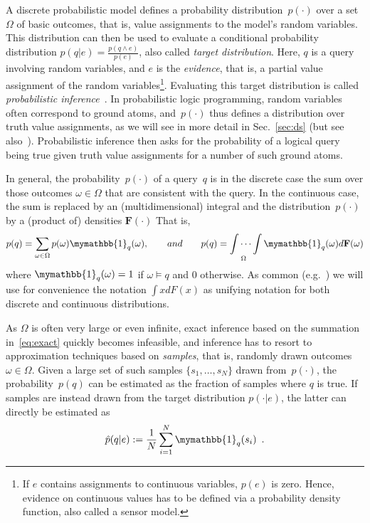 \documentclass{tlp}
\begin{document}
A discrete probabilistic model defines a probability
distribution~$p(\cdot)$ over a set~$\Omega$ of basic outcomes, that
is, value assignments to the model's random variables. This
distribution can then be used to evaluate a conditional probability
distribution $p(q|e) =\frac{p(q\wedge e)}{p(e)}$, also called
\emph{target distribution}.  Here, $q$ is a query involving random
variables, and $e$ is the \emph{evidence}, that is, a partial value
assignment of the random variables\footnote{If $e$ contains
  assignments to continuous variables, $p(e)$ is zero. Hence, evidence
  on continuous values has to be defined via a probability density
  function, also called a sensor model.}.  Evaluating this target
distribution is called \emph{probabilistic
  inference}~\cite{KollerFriedman09}. In probabilistic logic
programming, random variables often correspond to ground atoms,
and~$p(\cdot)$ thus defines a distribution over truth value
assignments, as we will see in more detail in Sec.~\ref{sec:ds} (but
see also~). Probabilistic inference then asks for
the probability of a logical query being true given truth value
assignments for a number of such ground atoms.

In general, the probability~$p(\cdot)$ of a query~$q$ is in the
discrete case the sum over those outcomes $\omega\in \Omega$ that are
consistent with the query.  In the continuous case, the sum is
replaced by an (multidimensional) integral and the
distribution~$p(\cdot)$ by a (product of) densities
$\mathbf{F}(\cdot)$ That is,
\begin{equation}\label{eq:exact}
p(q)= \sum_{\omega\in \Omega} p(\omega) \mymathbb{1}_{q}(\omega), \quad \quad and\quad \quad p(q)=\idotsint\limits_\Omega \mymathbb{1}_q(\omega) d\mathbf{F}(\omega)
\end{equation}
where $\mymathbb{1}_{q}(\omega)=1$ if $\omega\models q$ and $0$
otherwise.  As common (e.g.~\cite{wasserman04allof}) we will use for
convenience the notation $\int xdF(x)$ as unifying notation for both
discrete and continuous distributions.

As $\Omega$ is often very large or even infinite, exact inference
based on the summation in~\eqref{eq:exact} quickly becomes infeasible,
and inference has to resort to approximation techniques based on
\emph{samples}, that is, randomly drawn outcomes $\omega\in
\Omega$. Given a large set of such samples $\{s_1,\ldots,s_N\}$ drawn
from~$p(\cdot)$, the probability~$p(q)$ can be estimated as the
fraction of samples where $q$ is true. If samples are instead drawn
from the target distribution $p(\cdot|e)$, the latter can directly be
estimated as
\begin{equation*}
  \hat{p}(q|e) := \frac{1}{N}\sum_{i=1}^N \mymathbb{1}_q(s_i) \enspace.
\end{equation*}
\end{document}
